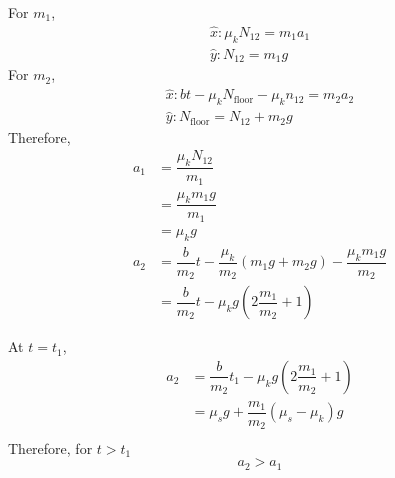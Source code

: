 \documentclass[fleqn]{article}
\begin{document}
For $m_1$,
\begin{align*}
	\hat{x} : \mu_k N_{12} = m_1 a_1\\
	\hat{y} : N_{12} = m_1 g
\end{align*}
For $m_2$,
\begin{align*}
	\hat{x} : bt - \mu_k N_{\text{floor}} - \mu_k n_{12} = m_2 a_2\\
	\hat{y} : N_{\text{floor}} = N_{12} + m_2 g
\end{align*}
Therefore,
\begin{align*}
	a_1 &= \dfrac{\mu_k N_{12}}{m_1}\\
	&= \dfrac{\mu_k m_1 g}{m_1}\\
	&= \mu_k g\\
	a_2 &= \dfrac{b}{m_2} t - \dfrac{\mu_k}{m_2} (m_1 g + m_2 g) - \dfrac{\mu_k m_1 g}{m_2}\\
	&= \dfrac{b}{m_2} t - \mu_k g \left( 2 \dfrac{m_1}{m_2} + 1 \right)
\end{align*}

At $t = t_1$,
\begin{align*}
	a_2 &= \dfrac{b}{m_2} t_1 - \mu_k g \left( 2 \dfrac{m_1}{m_2} + 1 \right)\\
	&= \mu_s g + \dfrac{m_1}{m_2} (\mu_s - \mu_k) g\\
\end{align*}
Therefore, for $t > t_1$
\begin{equation*}
	a_2 > a_1
\end{equation*}
\end{document}
